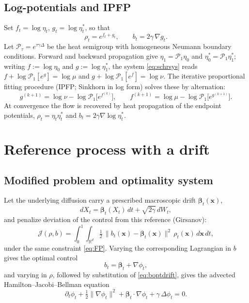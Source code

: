 \documentclass[11pt]{article}
\theoremstyle{remark}
\newcommand{\xv}{\mathbf{x}}
\newcommand{\bt}{\boldsymbol{\beta}}
\newcommand{\grad}{\nabla}
\newcommand{\Rd}{\mathbb{R}^d}
\begin{document}
\subsection{Log-potentials and IPFP}
Set $f_t=\log\eta_t$, $g_t=\log\eta^\ast_t$, so that
\begin{equation}
\rho_t=e^{f_t+g_t},\qquad b_t=2\gamma\,\grad g_t .
\end{equation}
Let $\mathcal{P}_\tau=e^{\tau\gamma\Delta}$ be the heat semigroup with homogeneous
Neumann boundary conditions. Forward and backward propagation give
$\eta_1=\mathcal{P}_1\eta_0$ and $\eta^\ast_0=\mathcal{P}_1\eta^\ast_1$; writing
$f:=\log\eta_0$ and $g:=\log\eta^\ast_1$, the system \eqref{eq:schrsys} reads
$f+\log\mathcal{P}_1[e^{g}]=\log\mu$ and $g+\log\mathcal{P}_1[e^{f}]=\log\nu$.
The iterative proportional fitting procedure (IPFP; Sinkhorn in log form) solves
these by alternation:
\begin{equation}
\label{eq:ipfp}
g^{(k+1)}=\log\nu-\log\mathcal{P}_1\!\bigl[e^{f^{(k)}}\bigr],
\qquad
f^{(k+1)}=\log\mu-\log\mathcal{P}_1\!\bigl[e^{g^{(k+1)}}\bigr].
\end{equation}
At convergence the flow is recovered by heat propagation of the endpoint
potentials, $\rho_t=\eta_t\eta^\ast_t$ and $b_t=2\gamma\grad\log\eta^\ast_t$.

\section{Reference process with a drift}
\label{sec:drift}

\subsection{Modified problem and optimality system}
Let the underlying diffusion carry a prescribed macroscopic drift
$\bt_t(\xv)$,
\begin{equation}
\label{eq:refSDE}
dX_t=\bt_t(X_t)\,dt+\sqrt{2\gamma}\,dW_t,
\end{equation}
and penalize deviation of the control from this reference (Girsanov):
\begin{equation}
\label{eq:Jdrift}
\mathcal{J}(\rho,b)=\int_0^1\!\!\int_{\Rd}\tfrac12\,\|b_t(\xv)-\bt_t(\xv)\|^2\,\rho_t(\xv)\,d\xv\,dt,
\end{equation}
under the same constraint \eqref{eq:FP}. Varying the corresponding Lagrangian in
$b$ gives the optimal control
\begin{equation}
\label{eq:boptdrift}
b_t=\bt_t+\grad\phi_t,
\end{equation}
and varying in $\rho$, followed by substitution of \eqref{eq:boptdrift}, gives the
advected Hamilton--Jacobi--Bellman equation
\begin{equation}
\label{eq:HJBdrift}
\partial_t\phi_t+\tfrac12\|\grad\phi_t\|^2+\bt_t\cdot\grad\phi_t+\gamma\,\Delta\phi_t=0 .
\end{equation}
\end{document}
